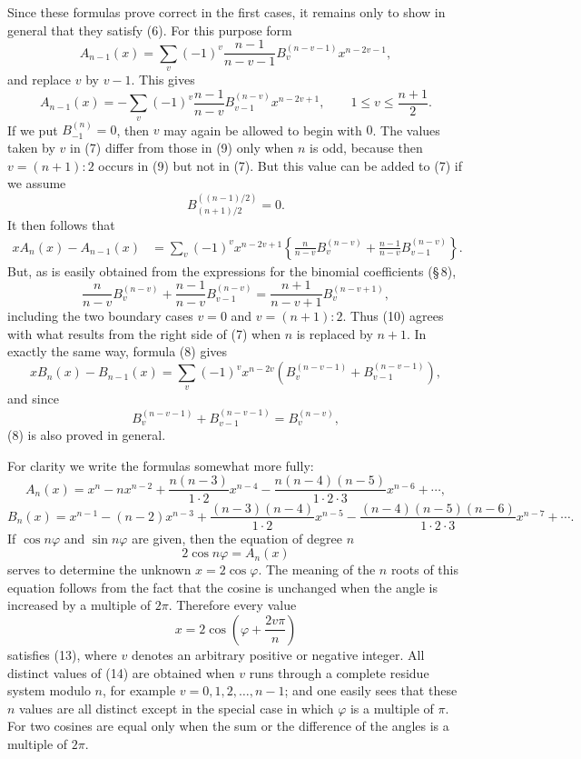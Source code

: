 \documentclass[11pt]{article}
\begin{document}
Since these formulas prove correct in the first cases, it remains only to show in general that they satisfy (6). For this purpose form
\[
        A_{n-1}(x)=\sum_v(-1)^v\frac{n-1}{n-v-1}B_v^{(n-v-1)}x^{n-2v-1},
\]
and replace $v$ by $v-1$. This gives
\[
\tag{9}        A_{n-1}(x)=-\sum_v(-1)^v\frac{n-1}{n-v}B_{v-1}^{(n-v)}x^{n-2v+1},
        \qquad 1\le v\le\frac{n+1}{2}.
\]
If we put $B_{-1}^{(n)}=0$, then $v$ may again be allowed to begin with $0$. The values taken by $v$ in (7) differ from those in (9) only when $n$ is odd, because then $v=(n+1):2$ occurs in (9) but not in (7). But this value can be added to (7) if we assume
\[
        B_{(n+1)/2}^{((n-1)/2)}=0.
\]
It then follows that
\[
\tag{10}\begin{aligned}
xA_n(x)-A_{n-1}(x)
&=\sum_v(-1)^v x^{n-2v+1}\left\{
\frac{n}{n-v}B_v^{(n-v)}+\frac{n-1}{n-v}B_{v-1}^{(n-v)}\right\}.
\end{aligned}
\]
But, as is easily obtained from the expressions for the binomial coefficients (\S\,8),
\[
        \frac{n}{n-v}B_v^{(n-v)}+\frac{n-1}{n-v}B_{v-1}^{(n-v)}
        =\frac{n+1}{n-v+1}B_v^{(n-v+1)},
\]
including the two boundary cases $v=0$ and $v=(n+1):2$. Thus (10) agrees with what results from the right side of (7) when $n$ is replaced by $n+1$. In exactly the same way, formula (8) gives
\[
        xB_n(x)-B_{n-1}(x)=\sum_v(-1)^v x^{n-2v}\left(B_v^{(n-v-1)}+B_{v-1}^{(n-v-1)}\right),
\]
and since
\[
        B_v^{(n-v-1)}+B_{v-1}^{(n-v-1)}=B_v^{(n-v)},
\]
(8) is also proved in general.

For clarity we write the formulas somewhat more fully:
\[
\tag{11}       A_n(x)=x^n-nx^{n-2}+\frac{n(n-3)}{1\cdot2}x^{n-4}
-\frac{n(n-4)(n-5)}{1\cdot2\cdot3}x^{n-6}+\cdots,
\]
\[
\tag{12}       B_n(x)=x^{n-1}-(n-2)x^{n-3}
+\frac{(n-3)(n-4)}{1\cdot2}x^{n-5}
-\frac{(n-4)(n-5)(n-6)}{1\cdot2\cdot3}x^{n-7}+\cdots.
\]
If $\cos n\varphi$ and $\sin n\varphi$ are given, then the equation of degree $n$
\[
\tag{13}       2\cos n\varphi=A_n(x)
\]
serves to determine the unknown $x=2\cos\varphi$. The meaning of the $n$ roots of this equation follows from the fact that the cosine is unchanged when the angle is increased by a multiple of $2\pi$. Therefore every value
\[
\tag{14}       x=2\cos\left(\varphi+\frac{2v\pi}{n}\right)
\]
satisfies (13), where $v$ denotes an arbitrary positive or negative integer. All distinct values of (14) are obtained when $v$ runs through a complete residue system modulo $n$, for example $v=0,1,2,\ldots,n-1$; and one easily sees that these $n$ values are all distinct except in the special case in which $\varphi$ is a multiple of $\pi$. For two cosines are equal only when the sum or the difference of the angles is a multiple of $2\pi$.
\end{document}
